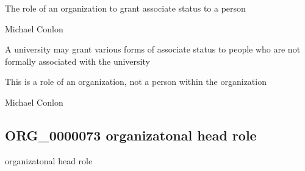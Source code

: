 \documentclass[letterpaper,10pt,english]{sphinxmanual}
\begin{document}
\begin{sphinxShadowBox}

\sphinxAtStartPar
{\hyperref[\detokenize{doc-BFO_0000023::doc}]{}}
\end{sphinxShadowBox}

\begin{sphinxShadowBox}

\sphinxAtStartPar
The role of an organization to grant associate status to a person
\end{sphinxShadowBox}

\begin{sphinxShadowBox}

\sphinxAtStartPar
Michael Conlon 
\end{sphinxShadowBox}

\begin{sphinxShadowBox}

\sphinxAtStartPar
A university may grant various forms of associate status to people who are not formally associated with the university
\end{sphinxShadowBox}

\begin{sphinxShadowBox}

\sphinxAtStartPar
This is a role of an organization, not a person within the organization
\end{sphinxShadowBox}

\begin{sphinxShadowBox}

\sphinxAtStartPar
Michael Conlon 
\end{sphinxShadowBox}
\begin{quote}

\ignorespaces \end{quote}


\subsection{ORG\_0000073 \sphinxhyphen{} organizatonal head role}
\label{\detokenize{doc-ORG_0000073:org-0000073-organizatonal-head-role}}\label{\detokenize{doc-ORG_0000073:index-0}}\label{\detokenize{doc-ORG_0000073::doc}}
\begin{sphinxShadowBox}

\sphinxAtStartPar
organizatonal head role
\end{sphinxShadowBox}
\end{document}
